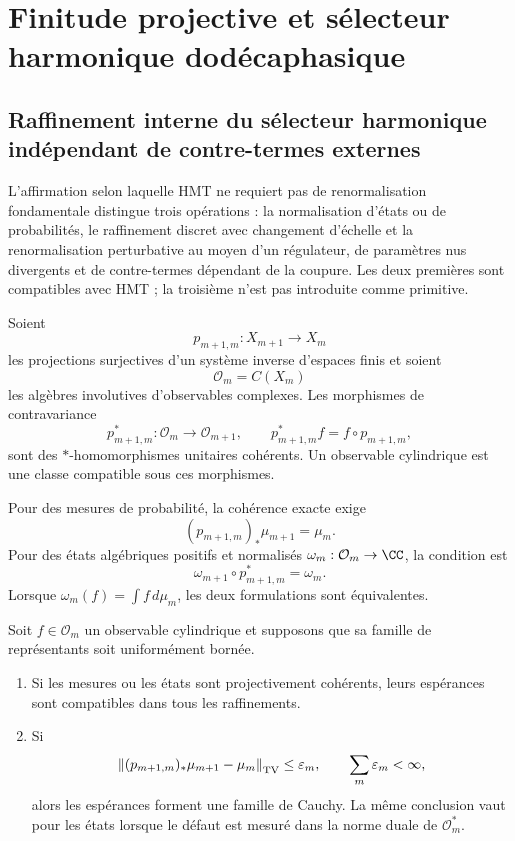 \chapter{Finitude projective et sélecteur harmonique dodécaphasique}
\label{chap:finitud-anisotropia}

\section{Raffinement interne du sélecteur harmonique indépendant de contre-termes externes}
\label{sec:refinamiento-sin-contraterminos}

L'affirmation selon laquelle HMT ne requiert pas de renormalisation fondamentale distingue
trois opérations : la normalisation d'états ou de probabilités, le raffinement
discret avec changement d'échelle et la renormalisation perturbative au moyen d'un
régulateur, de paramètres nus divergents et de contre-termes dépendant de la
coupure. Les deux premières sont compatibles avec HMT ; la troisième n'est pas introduite
comme primitive.

Soient
\[
 p_{m+1,m}:X_{m+1}\longrightarrow X_m
\]
les projections surjectives d'un système inverse d'espaces finis et
soient
\[
 \mathcal O_m=C(X_m)
\]
les algèbres involutives d'observables complexes. Les morphismes de
contravariance
\[
 p_{m+1,m}^{\ast}:\mathcal O_m\longrightarrow\mathcal O_{m+1},
 \qquad
 p_{m+1,m}^{\ast}f=f\circ p_{m+1,m},
\]
sont des \(\ast\)-homomorphismes unitaires cohérents. Un observable cylindrique est
une classe compatible sous ces morphismes.

Pour des mesures de probabilité, la cohérence exacte exige
\[
 (p_{m+1,m})_\ast\mu_{m+1}=\mu_m.
\]
Pour des états algébriques positifs et normalisés
\(\omega_m:\mathcal O_m\to\CC\), la condition est
\[
 \omega_{m+1}\circ p_{m+1,m}^{\ast}=\omega_m.
\]
Lorsque \(\omega_m(f)=\int f\,d\mu_m\), les deux formulations sont équivalentes.

\begin{theorem}
\label{thm:compatibilidad-proyectiva-defectos}
Soit \(f\in\mathcal O_m\) un observable cylindrique et supposons que sa famille
de représentants soit uniformément bornée.
\begin{enumerate}
 \item Si les mesures ou les états sont projectivement cohérents, leurs
 espérances sont compatibles dans tous les raffinements.
 \item Si
 \[
 \left\|(p_{m+1,m})_\ast\mu_{m+1}-\mu_m\right\|_{\rm TV}
 \leq\varepsilon_m,\qquad
 \sum_m\varepsilon_m<\infty,
 \]
 alors les espérances forment une famille de Cauchy. La même conclusion
 vaut pour les états lorsque le défaut est mesuré dans la norme duale de
 \(\mathcal O_m^\ast\).
\end{enumerate}
\end{theorem}

